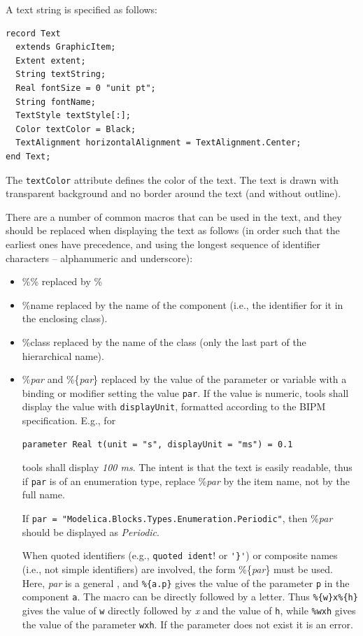 A text string is specified as follows:
\begin{lstlisting}[language=modelica]
record Text
  extends GraphicItem;
  Extent extent;
  String textString;
  Real fontSize = 0 "unit pt";
  String fontName;
  TextStyle textStyle[:];
  Color textColor = Black;
  TextAlignment horizontalAlignment = TextAlignment.Center;
end Text;
\end{lstlisting}%
The \lstinline!textColor! attribute defines the color of the text.
The text is drawn with transparent background and no border around the text (and without outline).

There are a number of common macros that can be used in the text, and they should be replaced when displaying the text as follows (in order such that the earliest ones have precedence, and using the longest sequence of identifier characters -- alphanumeric and underscore):
\begin{itemize}
\item
  \%\% replaced by \%
\item
  \%name replaced by the name of the component (i.e., the identifier for it in the enclosing class).
\item
  \%class replaced by the name of the class (only the last part of the hierarchical name).
\item
  \%\emph{par} and \%\{\emph{par}\} replaced by the value of the parameter or variable with a binding or modifier setting the value \lstinline!par!.
  If the value is numeric, tools shall display the value with \lstinline!displayUnit!, formatted according to the BIPM specification.
  E.g., for
\begin{lstlisting}[language=modelica]
parameter Real t(unit = "s", displayUnit = "ms") = 0.1
\end{lstlisting}
  tools shall display \emph{100 ms}.
  The intent is that the text is easily readable, thus if \lstinline!par! is of an enumeration type, replace \%\emph{par} by the item name, not by the full name.
  \begin{example}
  If \lstinline!par = "Modelica.Blocks.Types.Enumeration.Periodic"!, then \%\emph{par} should be displayed as \emph{Periodic}.
  \end{example}
  When quoted identifiers (e.g., \lstinline'quoted ident'! or \lstinline!'}'!) or composite names (i.e., not simple identifiers) are involved, the form \%\{\emph{par}\} must be used.
  Here, \emph{par} is a general , and \lstinline!%{a.p}! gives the value of the parameter \lstinline!p! in the component \lstinline!a!.
  The macro can be directly followed by a letter.
  Thus \lstinline!%{w}x%{h}! gives the value of \lstinline!w! directly followed by \emph{x} and the value of \lstinline!h!, while \lstinline!%wxh! gives the value of the parameter \lstinline!wxh!.
  If the parameter does not exist it is an error.
\end{itemize}

